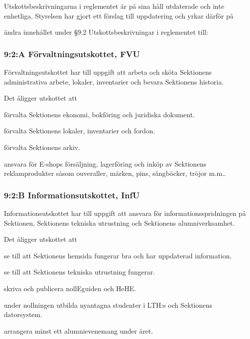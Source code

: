 \documentclass[../_main/handlingar.tex]{subfiles}
\begin{document}

Utskottsbeskrivningarna i reglementet är på sina håll utdaterade och inte enhetliga. Styrelsen har gjort ett förslag till uppdatering och yrkar därför på

\begin{attsatser}
    \att ändra innehållet under \S9:2 Utskottsbeskrivningar i reglementet till:\par
        \subsubsection*{9:2:A Förvaltningsutskottet, FVU}
        Förvaltningsutskottet har till uppgift att arbeta och sköta Sektionens administrativa arbete, lokaler, inventarier och bevara Sektionens historia.

        Det åligger utskottet att
        \begin{tightdashlist}
        \item förvalta Sektionens ekonomi, bokföring och juridiska dokument.
        \item förvalta Sektionens lokaler, inventarier och fordon.
        \item förvalta Sektionens arkiv.
        \item ansvara för E-shops försäljning, lagerföring och inköp av Sektionens reklamprodukter såsom ouveraller, märken, pins, sångböcker, tröjor m.m..
        \end{tightdashlist}

        \subsubsection*{9:2:B Informationsutskottet, InfU}
        Informationsutskottet har till uppgift att ansvara för informationsspridningen på Sektionen, Sektionens tekniska utrustning och Sektionens alumniverksamhet.

        Det åligger utskottet att
        \begin{tightdashlist}
            \item se till att Sektionens hemsida fungerar bra och har uppdaterad information.
            \item se till att Sektionens tekniska utrustning fungerar.
            \item skriva och publicera nollEguiden och HeHE.
            \item under nollningen utbilda nyantagna studenter i LTH:s och Sektionens datorsystem.
            \item arrangera minst ett alumnievenemang under året.
        \end{tightdashlist}


\end{attsatser}
\end{document}
